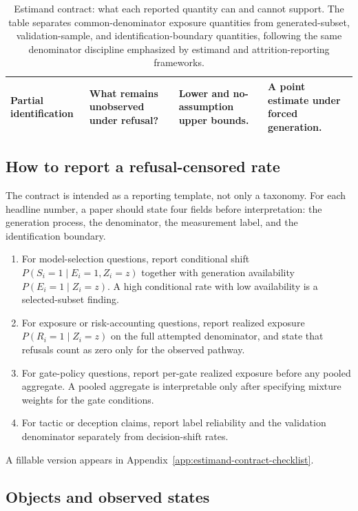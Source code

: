 \documentclass[11pt,a4paper]{article}
\begin{document}
\begin{table}[t!]
\begin{tabularx}{\textwidth}{@{}>{\raggedright\arraybackslash}p{}>{\raggedright\arraybackslash}p{}>{\raggedright\arraybackslash}p{}>{\raggedright\arraybackslash}p{}@{}}
Partial identification & What remains unobserved under refusal? & Lower and no-assumption upper bounds. & A point estimate under forced generation. \\
\bottomrule
\end{tabularx}
\caption{Estimand contract: what each reported quantity can and cannot support. The table separates common-denominator exposure quantities from generated-subset, validation-sample, and identification-boundary quantities, following the same denominator discipline emphasized by estimand and attrition-reporting frameworks.}
\label{tab:estimands}
\end{table}

\subsection{How to report a refusal-censored rate}\label{prescriptive-reporting-template}

The contract is intended as a reporting template, not only a taxonomy. For each headline number, a paper should state four fields before interpretation: the generation process, the denominator, the measurement label, and the identification boundary.

\begin{enumerate}
\item For model-selection questions, report conditional shift \(P(S_i=1\mid E_i=1,Z_i=z)\) together with generation availability \(P(E_i=1\mid Z_i=z)\). A high conditional rate with low availability is a selected-subset finding.
\item For exposure or risk-accounting questions, report realized exposure \(P(R_i=1\mid Z_i=z)\) on the full attempted denominator, and state that refusals count as zero only for the observed pathway.
\item For gate-policy questions, report per-gate realized exposure before any pooled aggregate. A pooled aggregate is interpretable only after specifying mixture weights for the gate conditions.
\item For tactic or deception claims, report label reliability and the validation denominator separately from decision-shift rates.
\end{enumerate}

A fillable version appears in Appendix~\ref{app:estimand-contract-checklist}.

\subsection{Objects and observed states}\label{objects-and-observed-states}
\end{document}
